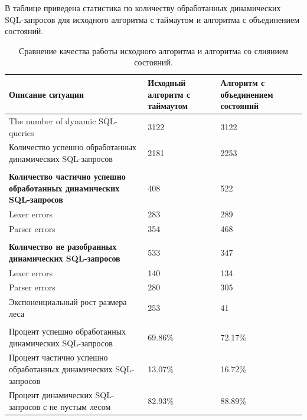 \documentclass{llncs}
\begin{document}
В таблице приведена статистика по количеству обработанных динамических SQL-запросов для исходного алгоритма с таймаутом и алгоритма с объединением состояний.
\begin{center}
\begin{table}
\caption{Сравнение качества работы исходного алгоритма и алгоритма со слиянием состояний.}
\begin{tabular}[c c c]{| p{5cm} | p{2.5cm} | p{2.5cm} |}
\hline
Описание ситуации & Исходный алгоритм с таймаутом & Алгоритм с объединением состояний
\\
\hline
The number of dynamic SQL-queries & 3122 & 3122
\\
\hline
Количество успешно обработанных динамических SQL-запросов & 2181 & 2253
\\
\hline
 & &
\\
\hline
\bfseries{Количество частично успешно обработанных динамических SQL-запросов} & 408 & 522
\\
\hline

 Lexer errors & 283 & 289
\\
\hline

 Parser errors & 354 & 468
\\
\hline
 & &
\\
\hline

\bfseries{Количество не разобранных динамических SQL-запросов} & 533 & 347
\\
\hline
  Lexer errors & 140 & 134
\\
\hline

 Parser errors & 280 & 305
\\
\hline

 Экспоненциальный рост размера леса & 253 & 41

\\
\hline
 & &
\\
\hline


Процент успешно обработанных динамических SQL-запросов & 69.86\% & 72.17\%
\\
\hline

Процент частично успешно обработанных динамических SQL-запросов & 13.07\% & 16.72\%
\\
\hline

Процент динамических SQL-запросов с не пустым лесом & 82.93\% & 88.89\%
\\
\hline
 
\end{tabular}
\end{table}
\end{center}
\end{document}
